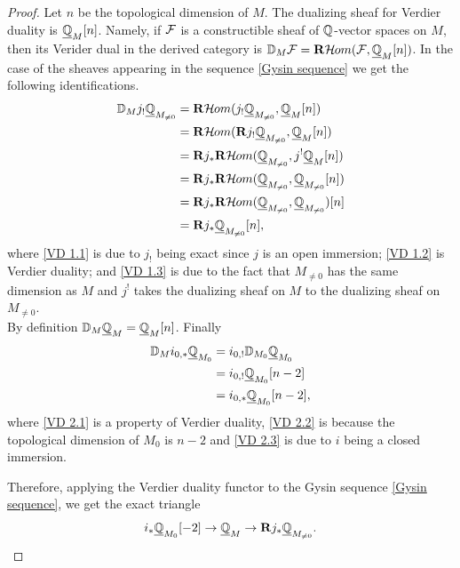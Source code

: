 \begin{proof}
Let $n$ be the topological dimension of $M$. The dualizing sheaf for Verdier duality is $\underline{\mathbb{Q}}_M[n]$. Namely, if $\mathcal{F}$ is a constructible sheaf of $\mathbb{Q}$-vector spaces on $M$, then its Verider dual in the derived category is $\mathbb{D}_M \mathcal{F} = \mathbf{R} \mathcal{H}\kern -.5pt om(\mathcal{F}, \underline{\mathbb{Q}}_M[n])$.
In the case of the sheaves appearing in the sequence \eqref{Gysin sequence} we get the following identifications.
\begin{align}
\mathbb{D}_M j_! \underline{\mathbb{Q}}_{M_{\neq 0}} &= \mathbf{R} \mathcal{H}\kern -.5pt om(j_! \underline{\mathbb{Q}}_{M_{\neq 0}}, \underline{\mathbb{Q}}_M[n]) \\
                                       &= \mathbf{R} \mathcal{H}\kern -.5pt om(\mathbf{R} j_! \underline{\mathbb{Q}}_{M_{\neq 0}}, \underline{\mathbb{Q}}_M[n]) \label{VD 1.1}\\
                                       &= \mathbf{R} j_* \mathbf{R} \mathcal{H}\kern -.5pt om(\underline{\mathbb{Q}}_{M_{\neq 0}}, j^!\underline{\mathbb{Q}}_M[n]) \label{VD 1.2}\\
                                       &= \mathbf{R} j_* \mathbf{R} \mathcal{H}\kern -.5pt om(\underline{\mathbb{Q}}_{M_{\neq 0}}, \underline{\mathbb{Q}}_{M_{\neq 0}}[n]) \label{VD 1.3} \\
                                       &= \mathbf{R} j_* \mathbf{R} \mathcal{H}\kern -.5pt om(\underline{\mathbb{Q}}_{M_{\neq 0}}, \underline{\mathbb{Q}}_{M_{\neq 0}})[n] \label{VD 1.4} \\
                                       &= \mathbf{R} j_* \underline{\mathbb{Q}}_{M_{\neq 0}}[n],
\end{align}
where \eqref{VD 1.1} is due to $j_!$ being exact since $j$ is an open immersion; \eqref{VD 1.2} is Verdier duality; and \eqref{VD 1.3} is due to the fact that $M_{\neq 0}$ has the same dimension as $M$ and $j^!$ takes the dualizing sheaf on $M$ to the dualizing sheaf on $M_{\neq 0}$.\\
By definition $\mathbb{D}_M \underline{\mathbb{Q}}_M = \underline{\mathbb{Q}}_M[n]$. Finally
\begin{align}
\mathbb{D}_M i_{0,*} \underline{\mathbb{Q}}_{M_0} &= i_{0,!} \mathbb{D}_{M_0} \underline{\mathbb{Q}}_{M_0} \label{VD 2.1}\\
                                &= i_{0,!} \underline{\mathbb{Q}}_{M_0}[n-2] \label{VD 2.2}\\
                                &= i_{0,*} \underline{\mathbb{Q}}_{M_0}[n-2] \label{VD 2.3},
\end{align}
where \eqref{VD 2.1} is a property of Verdier duality, \eqref{VD 2.2} is because the topological dimension of $M_0$ is $n-2$ and \eqref{VD 2.3} is due to $i$ being a closed immersion.

Therefore, applying the Verdier duality functor to the Gysin sequence \eqref{Gysin sequence}, we get the exact triangle
\begin{equation}
i_* \underline{\mathbb{Q}}_{M_0}[-2] \to \underline{\mathbb{Q}}_M \to \mathbf{R} j_* \underline{\mathbb{Q}}_{M_{\neq 0}}.
\end{equation}


\end{proof}
